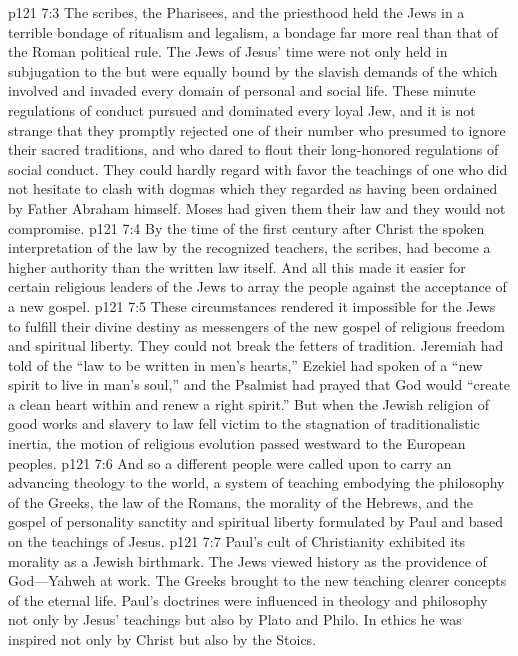 \vs p121 7:3 The scribes, the Pharisees, and the priesthood held the Jews in a terrible bondage of ritualism and legalism, a bondage far more real than that of the Roman political rule. The Jews of Jesus’ time were not only held in subjugation to the  but were equally bound by the slavish demands of the  which involved and invaded every domain of personal and social life. These minute regulations of conduct pursued and dominated every loyal Jew, and it is not strange that they promptly rejected one of their number who presumed to ignore their sacred traditions, and who dared to flout their long\hyp{}honored regulations of social conduct. They could hardly regard with favor the teachings of one who did not hesitate to clash with dogmas which they regarded as having been ordained by Father Abraham himself. Moses had given them their law and they would not compromise.
\vs p121 7:4 By the time of the first century after Christ the spoken interpretation of the law by the recognized teachers, the scribes, had become a higher authority than the written law itself. And all this made it easier for certain religious leaders of the Jews to array the people against the acceptance of a new gospel.
\vs p121 7:5 These circumstances rendered it impossible for the Jews to fulfill their divine destiny as messengers of the new gospel of religious freedom and spiritual liberty. They could not break the fetters of tradition. Jeremiah had told of the “law to be written in men’s hearts,” Ezekiel had spoken of a “new spirit to live in man’s soul,” and the Psalmist had prayed that God would “create a clean heart within and renew a right spirit.” But when the Jewish religion of good works and slavery to law fell victim to the stagnation of traditionalistic inertia, the motion of religious evolution passed westward to the European peoples.
\vs p121 7:6 And so a different people were called upon to carry an advancing theology to the world, a system of teaching embodying the philosophy of the Greeks, the law of the Romans, the morality of the Hebrews, and the gospel of personality sanctity and spiritual liberty formulated by Paul and based on the teachings of Jesus.
\pc \vs p121 7:7 Paul’s cult of Christianity exhibited its morality as a Jewish birthmark. The Jews viewed history as the providence of God---Yahweh at work. The Greeks brought to the new teaching clearer concepts of the eternal life. Paul’s doctrines were influenced in theology and philosophy not only by Jesus’ teachings but also by Plato and Philo. In ethics he was inspired not only by Christ but also by the Stoics.
